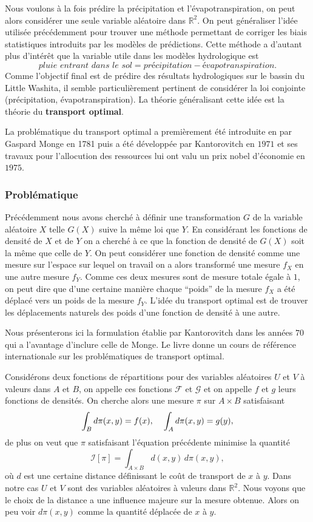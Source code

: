 \documentclass[a4paper,10pt]{article}
\begin{document}
Nous voulons à la fois prédire la précipitation et l'évapotranspiration, on peut alors considérer une seule variable aléatoire dans $\mathbb{R}^2$. On peut généraliser l'idée utilisée précédemment pour trouver une méthode permettant de corriger les biais statistiques introduits par les modèles de prédictions. Cette méthode a d'autant plus d'intérêt que la variable utile dans les modèles hydrologique est 
\[\textit{pluie entrant dans le sol}=\textit{précipitation}-\textit{évapotranspiration}.\]
Comme l'objectif final est de prédire des résultats hydrologiques sur le bassin du Little Washita, il semble particulièrement pertinent de considérer la loi conjointe (précipitation, évapotranspiration). La théorie généralisant cette idée est la théorie du \textbf{transport optimal}.

La problématique du transport optimal a premièrement été introduite en par Gaspard Monge en 1781 puis a été développée par Kantorovitch en $1971$ et ses travaux pour l'allocution des ressources lui ont valu un prix nobel d'économie en $1975$.

\subsubsection{Problématique}

Précédemment nous avons cherché à définir une transformation $G$ de la variable aléatoire $X$ telle $G(X)$ suive la même loi que $Y$. En considérant les fonctions de densité de $X$ et de $Y$ on a cherché à ce que la fonction de densité de $G(X)$ soit la même que celle de $Y$. On peut considérer une fonction de densité comme une mesure sur l'espace sur lequel on travail on a alors transformé une mesure $f_X$ en une autre mesure $f_Y$. Comme ces deux mesures sont de mesure totale égale à $1$, on peut dire que d'une certaine manière chaque ``poids'' de la mesure $f_X$ a été déplacé vers un poids de la mesure $f_Y$. L'idée du transport optimal est de trouver les déplacements naturels des poids d'une fonction de densité à une autre.  

Nous présenterons ici la formulation établie par Kantorovitch dans les années $70$ qui a l'avantage d'inclure celle de Monge. Le livre \cite{villani2003topics} donne un cours de référence internationale sur les problématiques de transport optimal. 

Considérons deux fonctions de répartitions pour des variables aléatoires $U$ et $V$ à valeurs dans $A$ et $B$, on appelle ces fonctions $\mathcal{F}$ et $\mathcal{G}$ et on appelle $f$ et $g$ leurs fonctions de densités. On cherche alors une mesure $\pi$ sur  $A \times B$ satisfaisant
\[\int_{B} d\pi(x,y)= f(x), \hspace{4mm} \int_{A}  d \pi(x,y)= g(y),\]
de plus on veut que $\pi$ satisfaisant l'équation précédente minimise la quantité
\[\mathcal{I}[\pi]=\int_{A \times B}d(x,y) \, d\pi(x,y),\]
où $d$ est une certaine distance définissant le coût de transport de $x$ à $y$. Dans notre cas $U$ et $V$ sont des variables aléatoires à valeurs dans $\mathbb{R}^2$. Nous voyons que le choix de la distance a une influence majeure sur la mesure obtenue. Alors on peu voir $d\pi(x,y)$ comme la quantité déplacée de $x$ à $y$.
\end{document}

